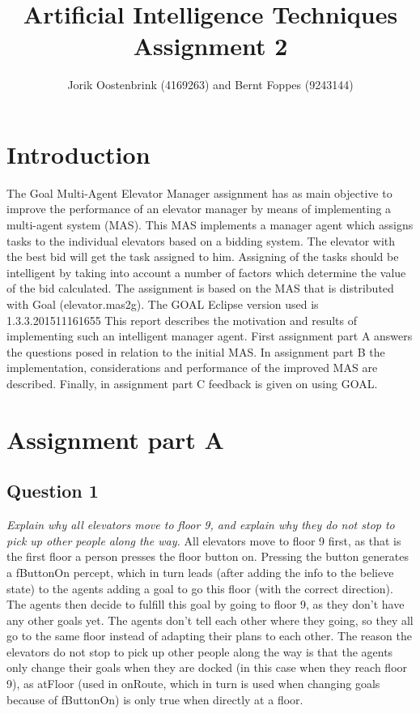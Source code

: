 \documentclass[a4paper,11pt]{article}
\title{Artificial Intelligence Techniques Assignment 2}
\author{Jorik Oostenbrink (4169263) and Bernt Foppes (9243144)}
\date{}
\begin{document}
\maketitle	

\section{Introduction}
The Goal Multi-Agent Elevator Manager assignment has as main objective to improve the performance of an elevator manager by means of implementing a multi-agent system (MAS). This MAS implements a manager agent which assigns tasks to the individual elevators based on a bidding system. The elevator with the best bid will get the task assigned to him. Assigning of the tasks should be intelligent by taking into account a number of factors which determine the value of the bid calculated. 
\newline\newline
The assignment is based on the MAS that is distributed with Goal (elevator.mas2g). The GOAL Eclipse version used is 1.3.3.201511161655  
\newline\newline
This report describes the motivation and results of implementing such an intelligent manager agent. First assignment part A answers the questions posed in relation to the initial MAS. In assignment part B the implementation, considerations and performance of the improved MAS are described. Finally, in assignment part C feedback is given on using GOAL. 

\section{Assignment part A}

\subsection{Question 1}
\textit{Explain why all elevators move to floor 9, and explain why they do not stop to pick up other people along the way.}
\newline\newline
All elevators move to floor 9 first, as that is the first floor a person presses the floor button on. Pressing the button generates a fButtonOn percept, which in turn leads (after adding the info to the believe state) to the agents adding a goal to go this floor (with the correct direction). The agents then decide to fulfill this goal by going to floor 9, as they don't have any other goals yet. The agents don't tell each other where they going, so they all go to the same floor instead of adapting their plans to each other.
\newline\newline
The reason the elevators do not stop to pick up other people along the way is that the agents only change their goals when they are docked (in this case when they reach floor 9), as atFloor (used in onRoute, which in turn is used when changing goals because of fButtonOn) is only true when directly at a floor.
\end{document}
